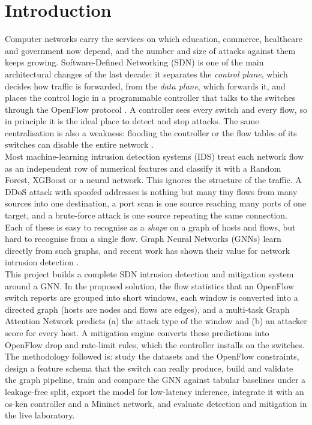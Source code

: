 \chapter{Introduction}

Computer networks carry the services on which education, commerce, healthcare and government now depend, and the number and size of attacks against them keeps growing. Software-Defined Networking (SDN) is one of the main architectural changes of the last decade: it separates the \emph{control plane}, which decides how traffic is forwarded, from the \emph{data plane}, which forwards it, and places the control logic in a programmable controller that talks to the switches through the OpenFlow protocol \cite{bib:openflow, bib:kreutz}. A controller sees every switch and every flow, so in principle it is the ideal place to detect and stop attacks. The same centralisation is also a weakness: flooding the controller or the flow tables of its switches can disable the entire network \cite{bib:yan}.\\

Most machine-learning intrusion detection systems (IDS) treat each network flow as an independent row of numerical features and classify it with a Random Forest, XGBoost or a neural network. This ignores the structure of the traffic. A DDoS attack with spoofed addresses is nothing but many tiny flows from many sources into one destination, a port scan is one source reaching many ports of one target, and a brute-force attack is one source repeating the same connection. Each of these is easy to recognise as a \emph{shape} on a graph of hosts and flows, but hard to recognise from a single flow. Graph Neural Networks (GNNs) \cite{bib:scarselli, bib:gnnreview} learn directly from such graphs, and recent work has shown their value for network intrusion detection \cite{bib:egraphsage, bib:anomale}.\\

This project builds a complete SDN intrusion detection and mitigation system around a GNN. In the proposed solution, the flow statistics that an OpenFlow switch reports are grouped into short windows, each window is converted into a directed graph (hosts are nodes and flows are edges), and a multi-task Graph Attention Network \cite{bib:gat} predicts (a) the attack type of the window and (b) an attacker score for every host. A mitigation engine converts these predictions into OpenFlow drop and rate-limit rules, which the controller installs on the switches. The methodology followed is: study the datasets and the OpenFlow constraints, design a feature schema that the switch can really produce, build and validate the graph pipeline, train and compare the GNN against tabular baselines under a leakage-free split, export the model for low-latency inference, integrate it with an os-ken controller and a Mininet network, and evaluate detection and mitigation in the live laboratory.


